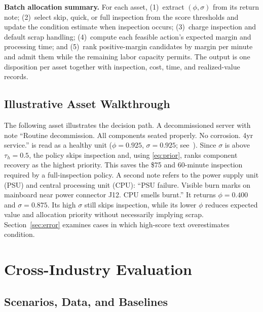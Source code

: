 \documentclass[a4paper,conference]{IEEEtran}
\begin{document}
\begin{samepage}
\smallskip\noindent\textbf{Batch allocation summary.}
For each asset, (1)~extract $(\phi,\sigma)$ from its return note;
(2)~select skip, quick, or full inspection from the score thresholds and update
the condition estimate when inspection occurs; (3)~charge inspection and default
scrap handling; (4)~compute each feasible action's expected margin and processing
time; and (5)~rank positive-margin candidates by margin per minute and admit them
while the remaining labor capacity permits. The output is one disposition per
asset together with inspection, cost, time, and realized-value records.
\end{samepage}

\subsection{Illustrative Asset Walkthrough}
The following asset illustrates the decision path. A decommissioned server with note ``Routine decommission.
All components seated properly. No corrosion. 4yr service.'' is read as a healthy unit
($\phi{=}0.925$, $\sigma{=}0.925$; see~\cite{RLDBRepo}). Since $\sigma$
is above $\tau_h{=}0.5$, the policy skips inspection and, using \eqref{eq:prior}, ranks
component recovery as the highest priority. This saves the \$75 and 60-minute
inspection required by a full-inspection policy. A second note refers to the power
supply unit (PSU) and central processing unit (CPU): ``PSU failure. Visible burn
marks on mainboard near power connector J12. CPU smells burnt.'' It returns
$\phi{=}0.400$ and $\sigma{=}0.875$.
Its high $\sigma$ still skips inspection, while its lower $\phi$ reduces expected value
and allocation priority without necessarily implying scrap. Section~\ref{sec:error} examines
cases in which high-score text overestimates condition.

\section{Cross-Industry Evaluation}

\subsection{Scenarios, Data, and Baselines}
\end{document}
